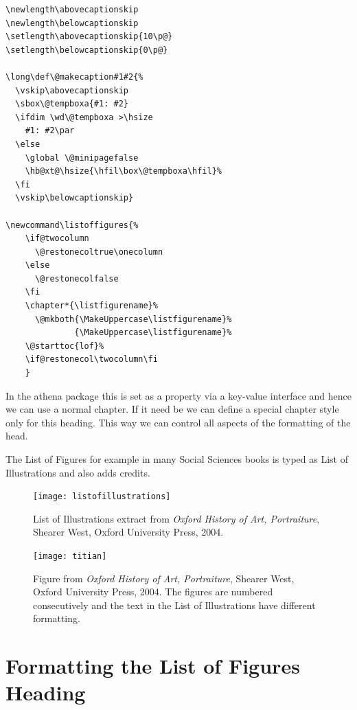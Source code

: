 \begin{tcolorbox}
\begin{lstlisting}
\newlength\abovecaptionskip
\newlength\belowcaptionskip
\setlength\abovecaptionskip{10\p@}
\setlength\belowcaptionskip{0\p@}

\long\def\@makecaption#1#2{%
  \vskip\abovecaptionskip
  \sbox\@tempboxa{#1: #2}
  \ifdim \wd\@tempboxa >\hsize
    #1: #2\par
  \else
    \global \@minipagefalse
    \hb@xt@\hsize{\hfil\box\@tempboxa\hfil}%
  \fi
  \vskip\belowcaptionskip}

\newcommand\listoffigures{%
    \if@twocolumn
      \@restonecoltrue\onecolumn
    \else
      \@restonecolfalse
    \fi
    \chapter*{\listfigurename}%
      \@mkboth{\MakeUppercase\listfigurename}%
              {\MakeUppercase\listfigurename}%
    \@starttoc{lof}%
    \if@restonecol\twocolumn\fi
    }
\end{lstlisting}
\end{tcolorbox}

\clearpage

In the athena package this is set as a property via a key-value interface and hence we can use a normal chapter. If it need be we can define a special chapter style only for this heading. This way we can control all aspects of the formatting of the head.

The List of Figures for example in many Social Sciences books is typed as List of Illustrations and also adds credits.


\begin{figure}[htp]
\texttt{[image: listofillustrations]}
\caption{List of Illustrations extract from \textit{Oxford History of Art, Portraiture}, Shearer West, Oxford University Press, 2004.}
\end{figure}
\begin{figure}[htp]
\texttt{[image: titian]}
\centering
\caption{Figure from \textit{Oxford History of Art, Portraiture}, Shearer West, Oxford University Press, 2004. The figures are numbered consecutively and the text in the List of Illustrations have different formatting.}
\end{figure}

\section{Formatting the List of Figures Heading}

